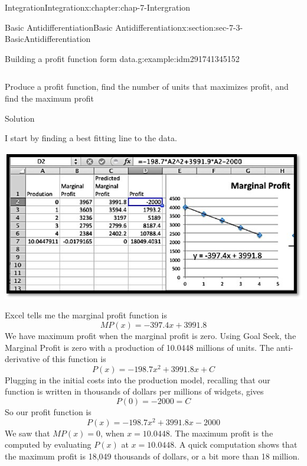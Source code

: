\documentclass[oneside,10pt,]{book}
\numberwithin{equation}{section}
\begin{document}
\begin{chapterptx}{Integration}{}{Integration}{}{}{x:chapter:chap-7-Intergration}
\begin{sectionptx}{Basic Antidifferentiation}{}{Basic Antidifferentiation}{}{}{x:section:sec-7-3-BasicAntidifferentiation}
\begin{example}{Building a profit function form data.}{g:example:idm291741345152}
\begin{sidebyside}{1}{0}{0}{0}
\begin{sbspanel}{1}
{{\begin{tabular}{cccccc}
\end{tabular}
}%
\par}
\end{sbspanel}%
\end{sidebyside}%
\par
Produce a profit function, find the number of units that maximizes profit, and find the maximum profit%
\par
Solution%
\par
I start by finding a best fitting line to the data.%
\begin{sidebyside}{1}{0.1}{0.1}{0}%
\begin{sbspanel}{0.8}%
\includegraphics[width=\linewidth]{images/sec7-3-2.png}
\end{sbspanel}%
\end{sidebyside}%
\par
Excel tells me the marginal profit function is%
%
\begin{equation*}
MP(x) = -397.4 x + 3991.8
\end{equation*}
We have maximum profit when the marginal profit is zero.  Using Goal Seek, the Marginal Profit is zero with a production of 10.0448 millions of units.  The anti-derivative of this function is%
%
\begin{equation*}
P(x)= -198.7 x^2  + 3991.8x + C
\end{equation*}
Plugging in the initial costs into the production model, recalling that our function is written in thousands of dollars per millions of widgets, gives%
%
\begin{equation*}
P(0) = -2000 = C
\end{equation*}
So our profit function is%
%
\begin{equation*}
P(x)= -198.7 x^2  + 3991.8 x-2000
\end{equation*}
We saw that \(MP(x) = 0\), when \(x = 10.0448\). The maximum profit is the computed by evaluating \(P(x)\) at \(x = 10.0448\). A quick computation shows that the  maximum profit is \textdollar{}18,049 thousands of dollars, or a bit more than \textdollar{}18 million.%

\end{example}
\end{sectionptx}
\end{chapterptx}
\end{document}
